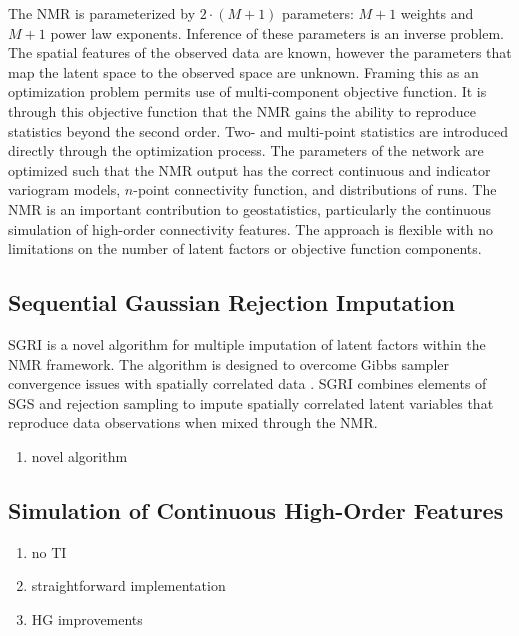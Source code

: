 The \gls{NMR} is parameterized by $2 \cdot (M+1)$ parameters: $M+1$ weights and $M+1$ power law exponents. Inference of these parameters is an inverse problem. The spatial features of the observed data are known, however the parameters that map the latent space to the observed space are unknown. Framing this as an optimization problem permits use of multi-component objective function. It is through this objective function that the \gls{NMR} gains the ability to reproduce statistics beyond the second order. Two- and multi-point statistics are introduced directly through the optimization process. The parameters of the network are optimized such that the \gls{NMR} output has the correct continuous and indicator variogram models, $n$-point connectivity function, and distributions of runs. The \gls{NMR} is an important contribution to geostatistics, particularly the continuous simulation of high-order connectivity features. The approach is flexible with no limitations on the number of latent factors or objective function components.

\subsection{Sequential Gaussian Rejection Imputation}
\label{subsec:07sgri}

\Gls{SGRI} is a novel algorithm for multiple imputation of latent factors within the \gls{NMR} framework. The algorithm is designed to overcome Gibbs sampler convergence issues with spatially correlated data \citep{silva2018enhanced}. \Gls{SGRI} combines elements of \gls{SGS} and rejection sampling to impute spatially correlated latent variables that reproduce data observations when mixed through the \gls{NMR}.

\begin{enumerate}
    \item novel algorithm
\end{enumerate}

\subsection{Simulation of Continuous High-Order Features}
\label{subsec:07hosim}

\begin{enumerate}
    \item no TI
    \item straightforward implementation
    \item HG improvements
\end{enumerate}


